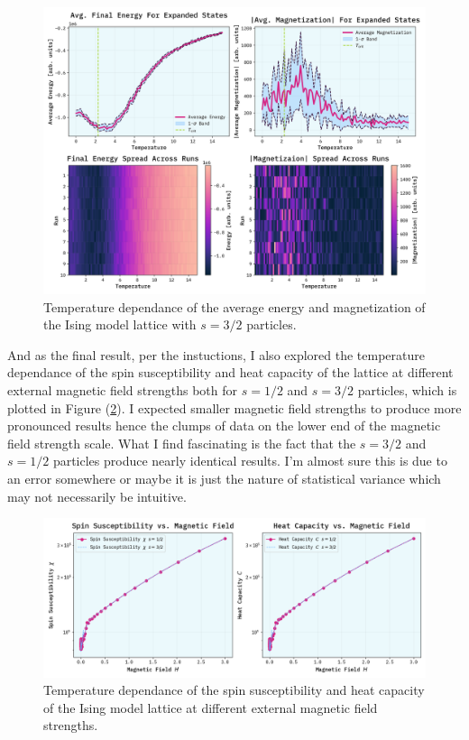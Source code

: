 \documentclass[10pt, titlepage, a4paper]{article}
\begin{document}
\begin{figure}[H]
    \centering
    \includegraphics[width=.95\textwidth]{../IsingModel/Images/avgE-avgS-vs-T-expanded.png}
    \caption{Temperature dependance of the average energy and magnetization of the Ising model lattice with $s=3/2$ particles.}
    \label{fig:ising-3/2-energy-magnetization}
\end{figure}

And as the final result, per the instuctions, I also explored the temperature dependance of the spin susceptibility and heat capacity of the
lattice at different external magnetic field strengths both for $s=1/2$ and $s=3/2$ particles, which is plotted in Figure (\ref{fig:ising-H}).
I expected smaller magnetic field strengths to produce more pronounced results hence the clumps of data on the lower end of the
magnetic field strength scale. What I find fascinating is the fact that the $s=3/2$ and $s=1/2$ particles produce nearly identical results.
I'm almost sure this is due to an error somewhere or maybe it is just the nature of statistical variance which may not necessarily be
intuitive.

\begin{figure}[H]
    \centering
    \includegraphics[width=.95\textwidth]{../IsingModel/Images/H-analysis.png}
    \caption{Temperature dependance of the spin susceptibility and heat capacity of the Ising model lattice at different external magnetic field strengths.}
    \label{fig:ising-H}
\end{figure}
\end{document}
